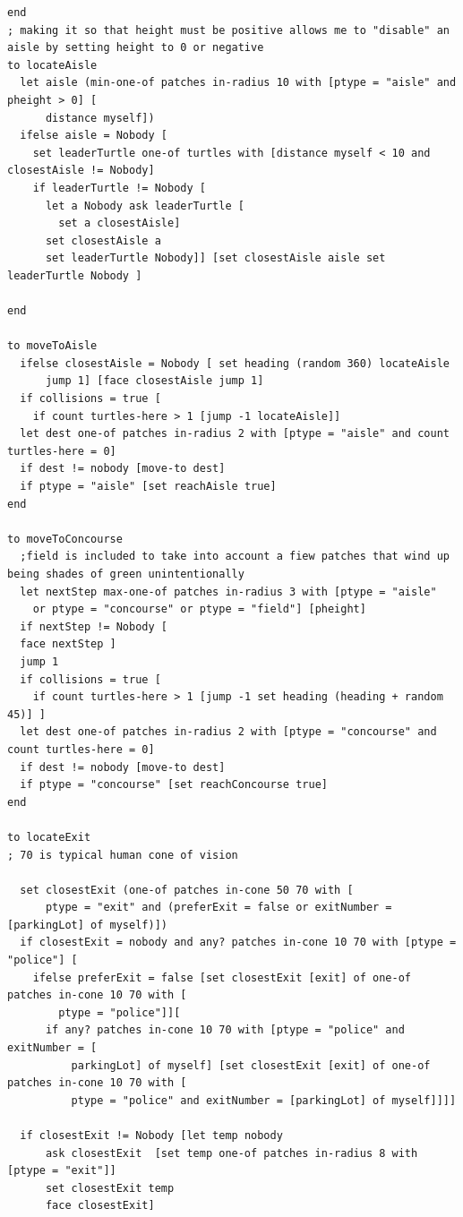 \documentclass{article}
\begin{document}
\begin{lstlisting}
end
; making it so that height must be positive allows me to "disable" an aisle by setting height to 0 or negative
to locateAisle
  let aisle (min-one-of patches in-radius 10 with [ptype = "aisle" and pheight > 0] [
      distance myself])
  ifelse aisle = Nobody [ 
    set leaderTurtle one-of turtles with [distance myself < 10 and closestAisle != Nobody] 
    if leaderTurtle != Nobody [
      let a Nobody ask leaderTurtle [
        set a closestAisle] 
      set closestAisle a  
      set leaderTurtle Nobody]] [set closestAisle aisle set leaderTurtle Nobody ] 
  
end

to moveToAisle
  ifelse closestAisle = Nobody [ set heading (random 360) locateAisle
      jump 1] [face closestAisle jump 1]
  if collisions = true [
    if count turtles-here > 1 [jump -1 locateAisle]]
  let dest one-of patches in-radius 2 with [ptype = "aisle" and count turtles-here = 0]
  if dest != nobody [move-to dest]    
  if ptype = "aisle" [set reachAisle true]
end

to moveToConcourse
  ;field is included to take into account a fiew patches that wind up being shades of green unintentionally
  let nextStep max-one-of patches in-radius 3 with [ptype = "aisle" 
    or ptype = "concourse" or ptype = "field"] [pheight] 
  if nextStep != Nobody [
  face nextStep ]
  jump 1
  if collisions = true [
    if count turtles-here > 1 [jump -1 set heading (heading + random 45)] ]
  let dest one-of patches in-radius 2 with [ptype = "concourse" and count turtles-here = 0]
  if dest != nobody [move-to dest]
  if ptype = "concourse" [set reachConcourse true]
end

to locateExit
; 70 is typical human cone of vision

  set closestExit (one-of patches in-cone 50 70 with [
      ptype = "exit" and (preferExit = false or exitNumber = [parkingLot] of myself)])
  if closestExit = nobody and any? patches in-cone 10 70 with [ptype = "police"] [
    ifelse preferExit = false [set closestExit [exit] of one-of patches in-cone 10 70 with [
        ptype = "police"]][
      if any? patches in-cone 10 70 with [ptype = "police" and exitNumber = [
          parkingLot] of myself] [set closestExit [exit] of one-of patches in-cone 10 70 with [
          ptype = "police" and exitNumber = [parkingLot] of myself]]]]
  
  if closestExit != Nobody [let temp nobody
      ask closestExit  [set temp one-of patches in-radius 8 with [ptype = "exit"]]
      set closestExit temp 
      face closestExit]  
      

\end{lstlisting}
\end{document}
